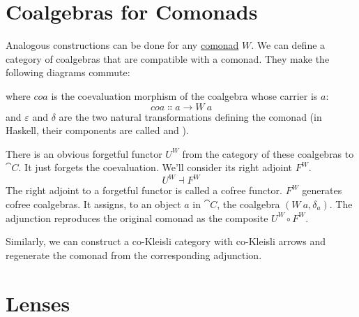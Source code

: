 \section{Coalgebras for Comonads}

Analogous constructions can be done for any
\hyperref[comonads]{comonad}
$W$. We can define a category of coalgebras that are compatible
with a comonad. They make the following diagrams commute:

\begin{figure}[H]
  \centering
  \begin{subfigure}
    \centering
  \end{subfigure}%
  \hspace{1cm}
  \begin{subfigure}
    \centering
  \end{subfigure}
\end{figure}

\noindent
where $coa$ is the coevaluation morphism of the coalgebra whose
carrier is $a$:
\[coa \Colon a \to W\ a\]
and $\varepsilon$ and $\delta$ are the two natural transformations
defining the comonad (in Haskell, their components are called
 and ).

There is an obvious forgetful functor $U^W$ from the category of
these coalgebras to $\cat{C}$. It just forgets the coevaluation. We'll
consider its right adjoint $F^W$.
\[U^W \dashv F^W\]
The right adjoint to a forgetful functor is called a cofree functor.
$F^W$ generates cofree coalgebras. It assigns, to an object
$a$ in $\cat{C}$, the coalgebra $(W\ a, \delta_a)$. The
adjunction reproduces the original comonad as the composite
$U^W \circ F^W$.

Similarly, we can construct a co-Kleisli category with co-Kleisli arrows
and regenerate the comonad from the corresponding adjunction.

\section{Lenses}

